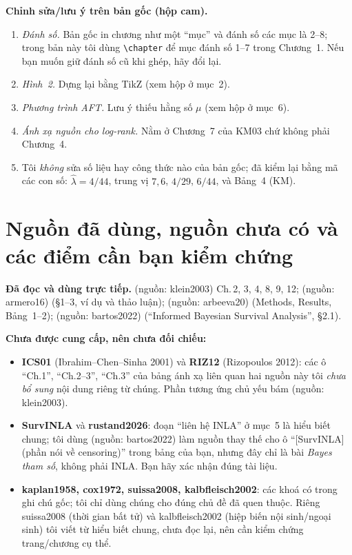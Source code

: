 \documentclass[11pt,a4paper,notitlepage]{report}
\providecommand{\nguon}[1]{(nguồn: #1)}
\begin{document}
\textbf{Chỉnh sửa/lưu ý trên bản gốc (hộp cam).}
\begin{enumerate}[leftmargin=1.6em,itemsep=2pt]
\item \emph{Đánh số.} Bản gốc in chương như một ``mục'' và đánh số các mục là 2--8; trong bản này tôi dùng \texttt{\textbackslash chapter} để mục đánh số 1--7 trong Chương~1. Nếu bạn muốn giữ đánh số cũ khi ghép, hãy đổi lại.
\item \emph{Hình~2.} Dựng lại bằng TikZ (xem hộp ở mục~2).
\item \emph{Phương trình AFT.} Lưu ý thiếu hằng số $\mu$ (xem hộp ở mục~6).
\item \emph{Ánh xạ nguồn cho log-rank.} Nằm ở Chương~7 của KM03 chứ không phải Chương~4.
\item Tôi \emph{không} sửa số liệu hay công thức nào của bản gốc; đã kiểm lại bằng mã các con số: $\hat\lambda=4/44$, trung vị $7{,}6$, $4/29$, $6/44$, và Bảng~4 (KM).
\end{enumerate}

\chapter{Nguồn đã dùng, nguồn chưa có và các điểm cần bạn kiểm chứng}

\textbf{Đã đọc và dùng trực tiếp.} \nguon{klein2003} Ch.\,2, 3, 4, 8, 9, 12; \nguon{armero16} (\S1--3, ví dụ và thảo luận); \nguon{arbeeva20} (Methods, Results, Bảng~1--2); \nguon{bartos2022} (``Informed Bayesian Survival Analysis'', \S2.1).

\textbf{Chưa được cung cấp, nên chưa đối chiếu:}
\begin{itemize}[leftmargin=1.4em,itemsep=2pt]
\item \textbf{ICS01} (Ibrahim--Chen--Sinha 2001) và \textbf{RIZ12} (Rizopoulos 2012): các ô ``Ch.1'', ``Ch.2--3'', ``Ch.3'' của bảng ánh xạ liên quan hai nguồn này tôi \emph{chưa bổ sung} nội dung riêng từ chúng. Phần tương ứng chủ yếu bám \nguon{klein2003}.
\item \textbf{SurvINLA} và \textbf{rustand2026}: đoạn ``liên hệ INLA'' ở mục~5 là hiểu biết chung; tôi dùng \nguon{bartos2022} làm nguồn thay thế cho ô ``[SurvINLA] (phần nói về censoring)'' trong bảng của bạn, nhưng đây chỉ là bài \emph{Bayes tham số}, không phải INLA. Bạn hãy xác nhận đúng tài liệu.
\item \textbf{kaplan1958, cox1972, suissa2008, kalbfleisch2002}: các khoá có trong ghi chú gốc; tôi chỉ dùng chúng cho đúng chủ đề đã quen thuộc. Riêng suissa2008 (thời gian bất tử) và kalbfleisch2002 (hiệp biến nội sinh/ngoại sinh) tôi viết từ hiểu biết chung, chưa đọc lại, nên cần kiểm chứng trang/chương cụ thể.
\end{itemize}
\end{document}
